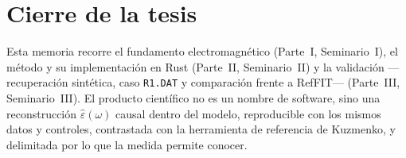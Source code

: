 \chapter*{Cierre de la tesis}

Esta memoria recorre el fundamento electromagn\'etico (Parte~I, Seminario~I), el m\'etodo y su implementaci\'on en Rust (Parte~II, Seminario~II) y la validaci\'on ---recuperaci\'on sint\'etica, caso \texttt{R1.DAT} y comparaci\'on frente a RefFIT--- (Parte~III, Seminario~III).
El producto cient\'ifico no es un nombre de software, sino una reconstrucci\'on $\hat\varepsilon(\omega)$ causal dentro del modelo, reproducible con los mismos datos y controles, contrastada con la herramienta de referencia de Kuzmenko, y delimitada por lo que la medida permite conocer.
